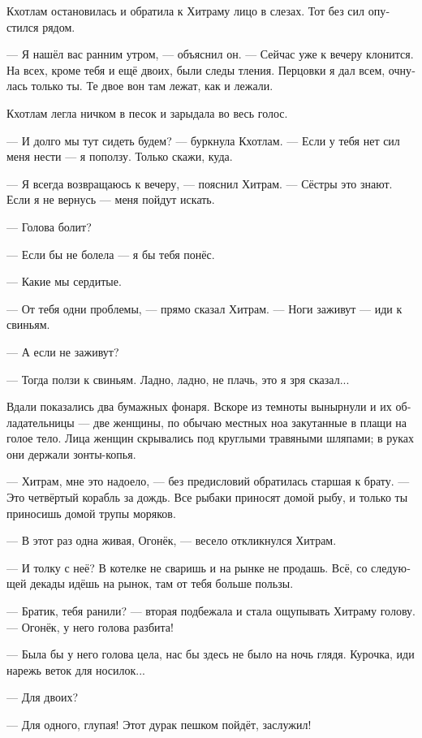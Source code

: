 \documentclass[a4paper,12pt,fleqn]{book}\usepackage{cooltooltips}\usepackage{polyglossia}\setdefaultlanguage[babelshorthands=true]{russian}\setotherlanguage{english}\defaultfontfeatures{Ligatures=TeX,Mapping=tex-text} \usepackage{xcolor}\definecolor{lightgray}{HTML}{bbbbbb}\color{lightgray}\newcommand{\ml}[3]{\textenglish{\textcolor{black}{#3}} }
\newcommand{\asterism}{\vspace{1em}{\centering\Large\bfseries$\ast~\ast~\ast$\par}\vspace{1em}}
\begin{document}
Кхотлам остановилась и обратила к Хитраму лицо в слезах.
Тот без сил опустился рядом.

--- Я нашёл вас ранним утром, --- объяснил он.
--- Сейчас уже к вечеру клонится.
На всех, кроме тебя и ещё двоих, были следы тления.
Перцовки я дал всем, очнулась только ты.
Те двое вон там лежат, как и лежали.

Кхотлам легла ничком в песок и зарыдала во весь голос.

\asterism

--- И долго мы тут сидеть будем? --- буркнула Кхотлам.
--- Если у тебя нет сил меня нести --- я поползу.
Только скажи, куда.

--- Я всегда возвращаюсь к вечеру, --- пояснил Хитрам.
--- Сёстры это знают.
Если я не вернусь --- меня пойдут искать.

--- Голова болит?

--- Если бы не болела --- я бы тебя понёс.

--- Какие мы сердитые.

--- От тебя одни проблемы, --- прямо сказал Хитрам.
--- Ноги заживут --- иди к свиньям.

--- А если не заживут?

--- Тогда ползи к свиньям.
Ладно, ладно, не плачь, это я зря сказал...

Вдали показались два бумажных фонаря.
Вскоре из темноты вынырнули и их обладательницы --- две женщины, по обычаю местных ноа закутанные в плащи на голое тело.
Лица женщин скрывались под круглыми травяными шляпами;
в руках они держали зонты-копья.

--- Хитрам, мне это надоело, --- без предисловий обратилась старшая к брату.
--- Это четвёртый корабль за дождь.
Все рыбаки приносят домой рыбу, и только ты приносишь домой трупы моряков.

--- В этот раз одна живая, Огонёк, --- весело откликнулся Хитрам.

--- И толку с неё?
В котелке не сваришь и на рынке не продашь.
Всё, со следующей декады идёшь на рынок, там от тебя больше пользы.

--- Братик, тебя ранили? --- вторая подбежала и стала ощупывать Хитраму голову.
--- Огонёк, у него голова разбита!

--- Была бы у него голова цела, нас бы здесь не было на ночь глядя.
Курочка, иди нарежь веток для носилок...

--- Для двоих?

--- Для одного, глупая!
Этот дурак пешком пойдёт, заслужил!
\end{document}

